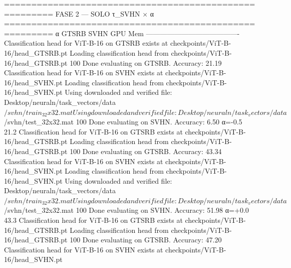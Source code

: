 =======================================================
  FASE 2 — SOLO τ_SVHN × α
=======================================================
  α             GTSRB     SVHN    GPU Mem
  ----------------------------------------
Classification head for ViT-B-16 on GTSRB exists at checkpoints/ViT-B-16/head_GTSRB.pt
Loading classification head from checkpoints/ViT-B-16/head_GTSRB.pt
100%
Done evaluating on GTSRB. Accuracy: 21.19%
Classification head for ViT-B-16 on SVHN exists at checkpoints/ViT-B-16/head_SVHN.pt
Loading classification head from checkpoints/ViT-B-16/head_SVHN.pt
Using downloaded and verified file: Desktop/neuraln/task_vectors/data$/svhn/train_32x32.mat
Using downloaded and verified file: Desktop/neuraln/task_vectors/data$/svhn/test_32x32.mat
100%
Done evaluating on SVHN. Accuracy: 6.50%
  α=-0.5        21.2%
Classification head for ViT-B-16 on GTSRB exists at checkpoints/ViT-B-16/head_GTSRB.pt
Loading classification head from checkpoints/ViT-B-16/head_GTSRB.pt
100%
Done evaluating on GTSRB. Accuracy: 43.34%
Classification head for ViT-B-16 on SVHN exists at checkpoints/ViT-B-16/head_SVHN.pt
Loading classification head from checkpoints/ViT-B-16/head_SVHN.pt
Using downloaded and verified file: Desktop/neuraln/task_vectors/data$/svhn/train_32x32.mat
Using downloaded and verified file: Desktop/neuraln/task_vectors/data$/svhn/test_32x32.mat
100%
Done evaluating on SVHN. Accuracy: 51.98%
  α=+0.0        43.3%
Classification head for ViT-B-16 on GTSRB exists at checkpoints/ViT-B-16/head_GTSRB.pt
Loading classification head from checkpoints/ViT-B-16/head_GTSRB.pt
100%
Done evaluating on GTSRB. Accuracy: 47.20%
Classification head for ViT-B-16 on SVHN exists at checkpoints/ViT-B-16/head_SVHN.pt
